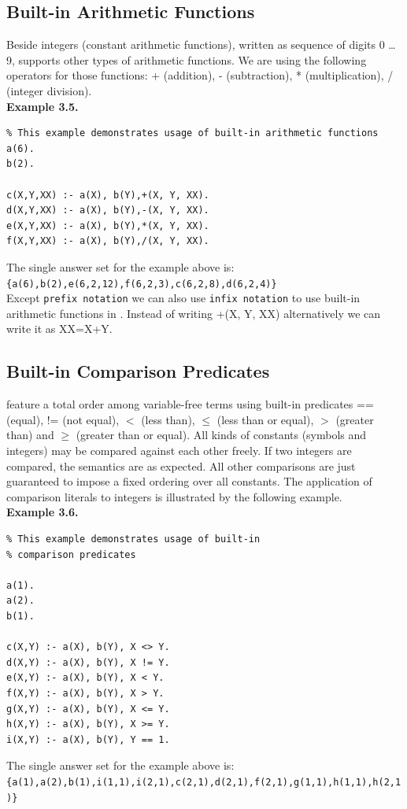 \documentclass[14pt,a4paper, titlepage]{article}
\begin{document}
\subsection{Built-in Arithmetic Functions}
Beside integers (constant arithmetic functions), written as sequence of digits 0 \dots 9, \dlvhex{} supports other types of arithmetic functions. We are using the following operators for those functions: + (addition), - (subtraction), * (multiplication), / (integer division). \\ \textbf{Example 3.5.}
\begin{lstlisting}
% This example demonstrates usage of built-in arithmetic functions
a(6).
b(2).

c(X,Y,XX) :- a(X), b(Y),+(X, Y, XX).
d(X,Y,XX) :- a(X), b(Y),-(X, Y, XX).
e(X,Y,XX) :- a(X), b(Y),*(X, Y, XX).
f(X,Y,XX) :- a(X), b(Y),/(X, Y, XX).
\end{lstlisting}
The single answer set for the example above is: \\ \texttt{\{a(6),b(2),e(6,2,12),f(6,2,3),c(6,2,8),d(6,2,4)\}}
\\Except \texttt{prefix notation} we can also use \texttt{infix notation} to use built-in arithmetic functions in \dlvhex{}. Instead of writing +(X, Y, XX) alternatively we can write it as XX=X+Y. 
     
\subsection{Built-in Comparison Predicates}
\dlvhex{} feature a total order among variable-free terms using built-in predicates == (equal), != (not equal), $<$ (less than), $\leq$ (less than or equal), $>$ (greater than) and $\geq$ (greater than or equal). All kinds of constants (symbols and integers) may be compared against each other freely. If two integers are compared, the semantics are as expected. All other comparisons are just guaranteed to impose a fixed ordering over all constants. The application of comparison literals to integers is illustrated by the following example.
\\ \textbf{Example 3.6.}
\begin{lstlisting}
% This example demonstrates usage of built-in 
% comparison predicates

a(1).
a(2).
b(1).

c(X,Y) :- a(X), b(Y), X <> Y.
d(X,Y) :- a(X), b(Y), X != Y.
e(X,Y) :- a(X), b(Y), X < Y.
f(X,Y) :- a(X), b(Y), X > Y.
g(X,Y) :- a(X), b(Y), X <= Y.
h(X,Y) :- a(X), b(Y), X >= Y.
i(X,Y) :- a(X), b(Y), Y == 1.
\end{lstlisting}
The single answer set for the example above is:\\ \texttt{\{a(1),a(2),b(1),i(1,1),i(2,1),c(2,1),d(2,1),f(2,1),g(1,1),h(1,1),h(2,1)\}}
\end{document}
